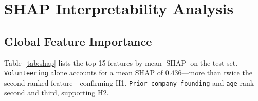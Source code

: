 \documentclass[10pt,twocolumn]{article}
\begin{document}
\begin{table}[H]
\centering
\caption{Chi-square test results for binary features vs.\ \texttt{founded\_nonprofit}.}
\label{tab:chi2}
\end{table}

\section{SHAP Interpretability Analysis}
\label{sec:shap}

\subsection{Global Feature Importance}

Table~\ref{tab:shap} lists the top 15 features by mean $|\text{SHAP}|$ on the test set. \texttt{Volunteering} alone accounts for a mean SHAP of $0.436$—more than twice the second-ranked feature—confirming H1. \texttt{Prior company founding} and \texttt{age} rank second and third, supporting H2.
\end{document}
